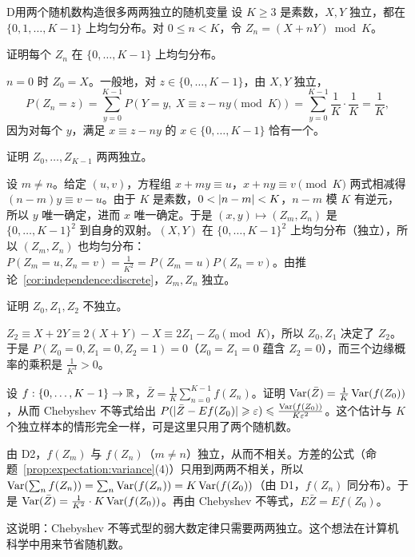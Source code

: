 \thinkingpart

\begin{probleme}[问题]{D}{用两个随机数构造很多两两独立的随机变量}
设 $K\geqslant3$ 是素数，$X,Y$ 独立，都在 $\{0,1,\dots,K-1\}$ 上均匀分布。对 $0\leqslant n<K$，令 $Z_n=(X+nY)\bmod K$。
\begin{questions}
\item 证明每个 $Z_n$ 在 $\{0,\dots,K-1\}$ 上均匀分布。
\begin{solution}
$n=0$ 时 $Z_0=X$。一般地，对 $z\in\{0,\dots,K-1\}$，由 $X,Y$ 独立，
\[
P(Z_n=z)=\sum_{y=0}^{K-1}P(Y=y,\ X\equiv z-ny\pmod K)=\sum_{y=0}^{K-1}\frac1K\cdot\frac1K=\frac1K,
\]
因为对每个 $y$，满足 $x\equiv z-ny$ 的 $x\in\{0,\dots,K-1\}$ 恰有一个。
\end{solution}

\item 证明 $Z_0,\dots,Z_{K-1}$ 两两独立。
\begin{solution}
设 $m\neq n$。给定 $(u,v)$，方程组 $x+my\equiv u$，$x+ny\equiv v\pmod K$ 两式相减得 $(n-m)y\equiv v-u$。由于 $K$ 是素数，$0<\lvert n-m\rvert<K$，$n-m$ 模 $K$ 有逆元，所以 $y$ 唯一确定，进而 $x$ 唯一确定。于是 $(x,y)\mapsto(Z_m,Z_n)$ 是 $\{0,\dots,K-1\}^2$ 到自身的双射。$(X,Y)$ 在 $\{0,\dots,K-1\}^2$ 上均匀分布（独立），所以 $(Z_m,Z_n)$ 也均匀分布：$P(Z_m=u,Z_n=v)=\frac1{K^2}=P(Z_m=u)P(Z_n=v)$。由推论~\ref{cor:independence:discrete}，$Z_m,Z_n$ 独立。
\end{solution}

\item 证明 $Z_0,Z_1,Z_2$ 不独立。
\begin{solution}
$Z_2\equiv X+2Y\equiv2(X+Y)-X\equiv2Z_1-Z_0\pmod K$，所以 $Z_0,Z_1$ 决定了 $Z_2$。于是 $P(Z_0=0,Z_1=0,Z_2=1)=0$（$Z_0=Z_1=0$ 蕴含 $Z_2=0$），而三个边缘概率的乘积是 $\frac1{K^3}>0$。
\end{solution}

\item 设 $f:\{0,\dots,K-1\}\to\mathbb{R}$，$\bar Z=\frac1K\sum_{n=0}^{K-1}f(Z_n)$。证明 $\operatorname{Var}(\bar Z)=\frac1K\operatorname{Var}(f(Z_0))$，从而 Chebyshev 不等式给出 $P(\lvert \bar Z-Ef(Z_0)\rvert\geqslant\varepsilon)\leqslant\frac{\operatorname{Var}(f(Z_0))}{K\varepsilon^2}$。这个估计与 $K$ 个独立样本的情形完全一样，可是这里只用了两个随机数。
\begin{solution}
由 D2，$f(Z_m)$ 与 $f(Z_n)$（$m\neq n$）独立，从而不相关。方差的公式（命题~\ref{prop:expectation:variance}(4)）只用到两两不相关，所以 $\operatorname{Var}(\sum_nf(Z_n))=\sum_n\operatorname{Var}(f(Z_n))=K\operatorname{Var}(f(Z_0))$（由 D1，$f(Z_n)$ 同分布）。于是 $\operatorname{Var}(\bar Z)=\frac1{K^2}\cdot K\operatorname{Var}(f(Z_0))$。再由 Chebyshev 不等式，$E\bar Z=Ef(Z_0)$。

这说明：Chebyshev 不等式型的弱大数定律只需要两两独立。这个想法在计算机科学中用来节省随机数。
\end{solution}
\end{questions}
\end{probleme}

